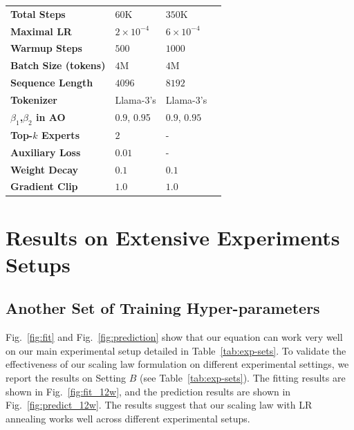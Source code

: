 \begin{table}[p]
\begin{center}
\begin{tabular}{llll}
\textbf{Total Steps} & $60$K & $350$K & \\
\textbf{Maximal LR} & $2\times10^{-4}$ & $6\times10^{-4}$ & \\
\textbf{Warmup Steps} & $500$ & $1000$ & \\
\textbf{Batch Size (tokens) } & $4$M & $4$M & \\
\textbf{Sequence Length} & $4096$ & $8192$ & \\
\textbf{Tokenizer} & Llama-3's & Llama-3's &  \\
\textbf{$\beta_1$,$\beta_2$ in AO} & $0.9$, $0.9$5 &  $0.9$, $0.95$ & \\
\textbf{Top-$k$ Experts} & $2$ & - &  \\
\textbf{Auxiliary Loss} & $0.01$ & - &  \\
\textbf{Weight Decay}  & $0.1$ & $0.1$ & \\
\textbf{Gradient Clip}  & $1.0$ & $1.0$ & \\
\bottomrule
\end{tabular}
\end{center}
\end{table}

\section{Results on Extensive Experiments Setups}
\subsection{Another Set of Training Hyper-parameters}
\label{apx:exp-2}
Fig.~\ref{fig:fit} and Fig.~\ref{fig:prediction} show that our equation can work very well on our main experimental setup detailed in Table~\ref{tab:exp-sets}.
To validate the effectiveness of our scaling law formulation on different experimental settings, we report the results on Setting $B$ (see Table~\ref{tab:exp-sets}). The fitting results are shown in Fig.~\ref{fig:fit_12w}, and the prediction results are shown in Fig.~\ref{fig:predict_12w}. The results suggest that our scaling law with LR annealing works well across different experimental setups.

\newpage

